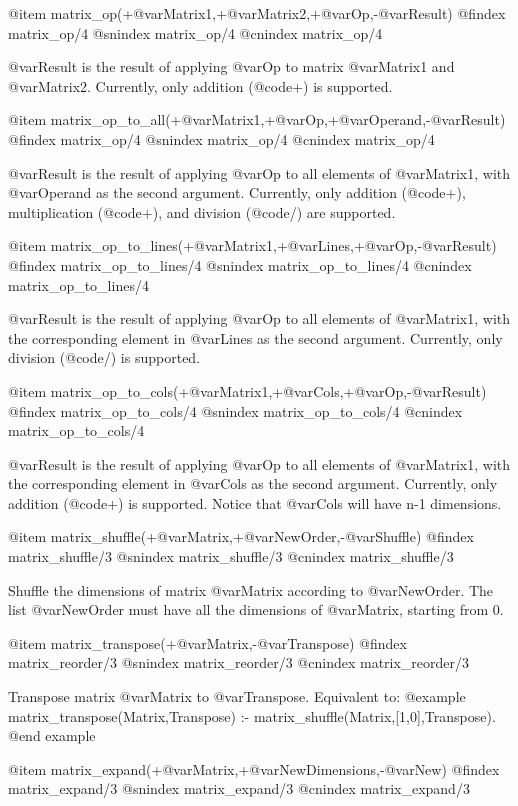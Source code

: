 {{{{{{{{{@item matrix_op(+@var{Matrix1},+@var{Matrix2},+@var{Op},-@var{Result})
@findex matrix_op/4
@snindex matrix_op/4
@cnindex matrix_op/4

@var{Result} is the result of applying @var{Op} to matrix @var{Matrix1}
and @var{Matrix2}. Currently, only addition (@code{+}) is supported.

@item matrix_op_to_all(+@var{Matrix1},+@var{Op},+@var{Operand},-@var{Result})
@findex matrix_op/4
@snindex matrix_op/4
@cnindex matrix_op/4

@var{Result} is the result of applying @var{Op} to all elements of
@var{Matrix1}, with @var{Operand} as the second argument. Currently,
only addition (@code{+}), multiplication (@code{+}), and division
(@code{/}) are supported.

@item matrix_op_to_lines(+@var{Matrix1},+@var{Lines},+@var{Op},-@var{Result})
@findex matrix_op_to_lines/4
@snindex matrix_op_to_lines/4
@cnindex matrix_op_to_lines/4

@var{Result} is the result of applying @var{Op} to all elements of
@var{Matrix1}, with the corresponding element in @var{Lines} as the
second argument. Currently, only division (@code{/}) is supported.

@item matrix_op_to_cols(+@var{Matrix1},+@var{Cols},+@var{Op},-@var{Result})
@findex matrix_op_to_cols/4
@snindex matrix_op_to_cols/4
@cnindex matrix_op_to_cols/4

@var{Result} is the result of applying @var{Op} to all elements of
@var{Matrix1}, with the corresponding element in @var{Cols} as the
second argument. Currently, only addition (@code{+}) is
supported. Notice that @var{Cols} will have n-1 dimensions.

@item matrix_shuffle(+@var{Matrix},+@var{NewOrder},-@var{Shuffle})
@findex matrix_shuffle/3
@snindex matrix_shuffle/3
@cnindex matrix_shuffle/3

Shuffle the dimensions of matrix @var{Matrix} according to
@var{NewOrder}. The list @var{NewOrder} must have all the dimensions of
@var{Matrix}, starting from 0.

@item matrix_transpose(+@var{Matrix},-@var{Transpose})
@findex matrix_reorder/3
@snindex matrix_reorder/3
@cnindex matrix_reorder/3

Transpose matrix @var{Matrix} to  @var{Transpose}. Equivalent to:
@example
matrix_transpose(Matrix,Transpose) :-
        matrix_shuffle(Matrix,[1,0],Transpose).
@end example

@item matrix_expand(+@var{Matrix},+@var{NewDimensions},-@var{New})
@findex matrix_expand/3
@snindex matrix_expand/3
@cnindex matrix_expand/3

}}}}}}}}}
